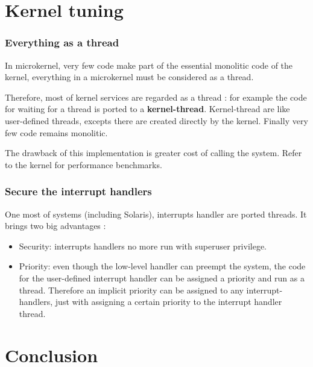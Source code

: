 \section{Kernel tuning}


\begin{frame}
\frametitle{Everything as a thread}

In microkernel, very few code make part of the essential monolitic code of the kernel, everything in a microkernel must be considered as a thread.

\-

Therefore, most of kernel services are regarded as a thread : for example the code for waiting for a thread is ported to a \textbf{kernel-thread}. Kernel-thread are like user-defined threads, excepts there are created directly by the kernel. Finally very few code remains monolitic.

\-

The drawback of this implementation is greater cost of calling the system. Refer to the  kernel for performance benchmarks.

\end{frame}


\begin{frame}
\frametitle{Secure the interrupt handlers}

One most of systems (including Solaris), interrupts handler are ported threads. It brings two big advantages :

\begin{itemize}
\item
Security: interrupts handlers no more run with superuser privilege.
\item
Priority: even though the low-level handler can preempt the system, the code for the user-defined interrupt handler can be assigned a priority and run as a thread. Therefore an implicit priority can be assigned to any interrupt-handlers, just with assigning a certain priority to the interrupt handler thread.
\end{itemize}

\end{frame}


%
%

\section{Conclusion}

